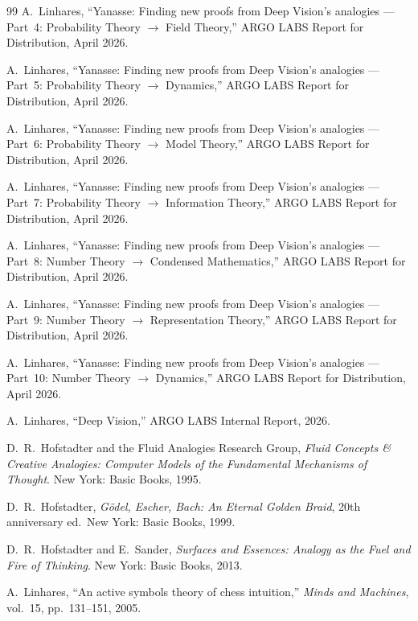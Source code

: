 \documentclass[11pt]{article}
\theoremstyle{definition}
\theoremstyle{remark}
\begin{document}
\begin{thebibliography}{99}
A.~Linhares,
``Yanasse: Finding new proofs from Deep Vision's analogies --- Part~4:
Probability Theory $\to$ Field Theory,''
ARGO LABS Report for Distribution, April 2026.

A.~Linhares,
``Yanasse: Finding new proofs from Deep Vision's analogies --- Part~5:
Probability Theory $\to$ Dynamics,''
ARGO LABS Report for Distribution, April 2026.

A.~Linhares,
``Yanasse: Finding new proofs from Deep Vision's analogies --- Part~6:
Probability Theory $\to$ Model Theory,''
ARGO LABS Report for Distribution, April 2026.

A.~Linhares,
``Yanasse: Finding new proofs from Deep Vision's analogies --- Part~7:
Probability Theory $\to$ Information Theory,''
ARGO LABS Report for Distribution, April 2026.

A.~Linhares,
``Yanasse: Finding new proofs from Deep Vision's analogies --- Part~8:
Number Theory $\to$ Condensed Mathematics,''
ARGO LABS Report for Distribution, April 2026.

A.~Linhares,
``Yanasse: Finding new proofs from Deep Vision's analogies --- Part~9:
Number Theory $\to$ Representation Theory,''
ARGO LABS Report for Distribution, April 2026.

A.~Linhares,
``Yanasse: Finding new proofs from Deep Vision's analogies --- Part~10:
Number Theory $\to$ Dynamics,''
ARGO LABS Report for Distribution, April 2026.

A.~Linhares,
``Deep Vision,''
ARGO LABS Internal Report, 2026.

D.~R.~Hofstadter and the Fluid Analogies Research Group,
\emph{Fluid Concepts \& Creative Analogies: Computer Models of the
Fundamental Mechanisms of Thought}. New York: Basic Books, 1995.

D.~R.~Hofstadter,
\emph{G\"odel, Escher, Bach: An Eternal Golden Braid},
20th anniversary ed.\ New York: Basic Books, 1999.

D.~R.~Hofstadter and E.~Sander,
\emph{Surfaces and Essences: Analogy as the Fuel and Fire of
Thinking}. New York: Basic Books, 2013.

A.~Linhares,
``An active symbols theory of chess intuition,''
\emph{Minds and Machines}, vol.~15, pp.~131--151, 2005.


\end{thebibliography}
\end{document}
